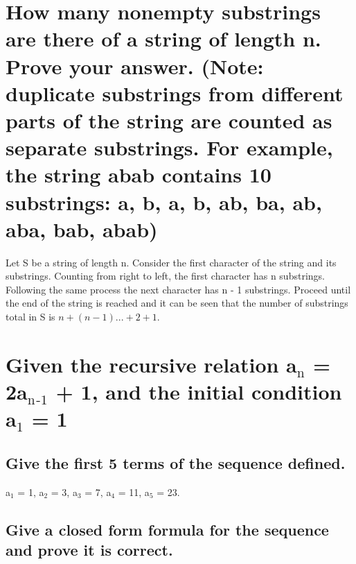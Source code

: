 \documentclass[11pt]{article}
\begin{document}
\section{How many nonempty substrings are there of a string of length n. Prove your answer. (Note: duplicate substrings from different parts of the string are counted as separate substrings. For example, the string abab contains 10 substrings: a, b, a, b, ab, ba, ab, aba, bab, abab)}
\label{sec:org398b31a}
\quad Let S be a string of length n. Consider the first character of the string and its substrings. Counting from right to left, the first character has n substrings. Following the same process the next character has n - 1 substrings. Proceed until the end of the string is reached and it can be seen that the number of substrings total in S is \(n + (n - 1) ... + 2 + 1\). 
\section{Given the recursive relation a\(_{\text{n}}\) = 2a\(_{\text{n}}\)\(_{\text{-1}}\) + 1, and the initial condition a\(_{\text{1}}\) = 1}
\label{sec:orgedb6260}
\subsection{Give the first 5 terms of the sequence defined.}
\label{sec:org7b87f21}
\quad a\(_{\text{1}}\) = 1, a\(_{\text{2}}\) = 3, a\(_{\text{3}}\) = 7, a\(_{\text{4}}\) = 11, a\(_{\text{5}}\) = 23.
\subsection{Give a closed form formula for the sequence and prove it is correct.}
\label{sec:org0e48784}
\quad 
\end{document}
